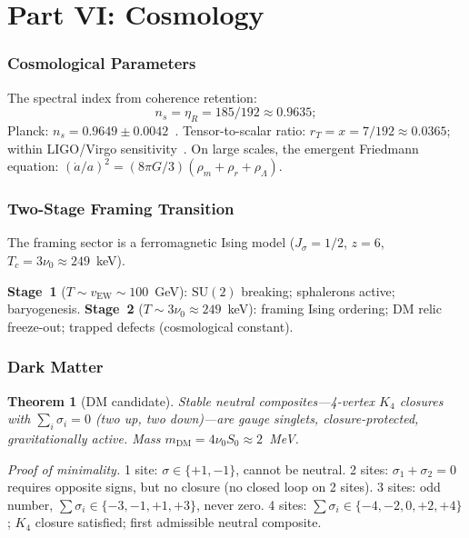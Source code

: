 \documentclass[11pt,twocolumn]{article}
\newtheorem{theorem}{Theorem}
\begin{document}

\part*{Part VI: Cosmology}

\section{Cosmological Parameters}
\label{sec:cosmo}

The spectral index from coherence retention:
\begin{equation}
n_s=\eta_R=185/192\approx 0.9635;
\label{eq:ns}
\end{equation}
Planck: $n_s=0.9649\pm 0.0042$~\cite{planck2018}.
Tensor-to-scalar ratio: $r_T=x=7/192\approx 0.0365$; within LIGO/Virgo sensitivity~\cite{ligo2016}.
On large scales, the emergent Friedmann equation: $(\dot a/a)^2=(8\pi G/3)(\rho_m+\rho_r+\rho_\Lambda)$.

\section{Two-Stage Framing Transition}
\label{sec:transition}

The framing sector is a ferromagnetic Ising model ($J_\sigma=1/2$, $z=6$, $T_c=3\nu_0\approx 249$~keV).

\textbf{Stage~1} ($T\sim v_{\mathrm{EW}}\sim 100$~GeV): $\mathrm{SU}(2)$ breaking; sphalerons active; baryogenesis.
\textbf{Stage~2} ($T\sim 3\nu_0\approx 249$~keV): framing Ising ordering; DM relic freeze-out; trapped defects (cosmological constant).

\section{Dark Matter}
\label{sec:dm}

\begin{theorem}[DM candidate]
\label{thm:dm}
Stable neutral composites---4-vertex $K_4$ closures with $\sum_i\sigma_i=0$ (two up, two down)---are gauge singlets, closure-protected, gravitationally active.
Mass $m_{\mathrm{DM}}=4\nu_0 S_0\approx 2$~MeV.
\end{theorem}

\textit{Proof of minimality.}
1 site: $\sigma\in\{+1,-1\}$, cannot be neutral.
2 sites: $\sigma_1+\sigma_2=0$ requires opposite signs, but no closure (no closed loop on 2 sites).
3 sites: odd number, $\sum\sigma_i\in\{-3,-1,+1,+3\}$, never zero.
4 sites: $\sum\sigma_i\in\{-4,-2,0,+2,+4\}$; $K_4$ closure satisfied; first admissible neutral composite.
\end{document}
